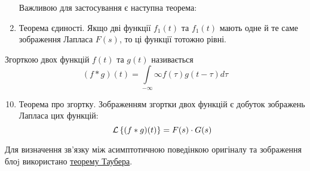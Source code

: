 \begin{enumerate}[label=\arabic*.]
\hspace*{\dimexpr\linewidth-\textwidth\relax} Важливою для застосування є наступна теорема:

		\item Теорема єдиності. Якщо дві функції $f_1(t)$ та $f_1(t)$ мають одне й те саме зображення Лапласа $F(s)$, то ці функції тотожно рівні.
\end{enumerate}
\begin{defin}
Згорткою двох функцій $f(t)$ та $g(t)$ називається
	\begin{equation}
		(f*g)(t) = \int\limits_{-\infty}{\infty} f(\tau) g(t - \tau) d\tau
	\end{equation}
\end{defin}
\begin{enumerate}[label=\arabic*.]
	\setcounter{enumi}{9}
	\item Теорема про згортку. Зображенням згортки двох функцій є добуток зображень Лапласа цих функцій:
		\begin{equation}
			\mathcal{L}\left\{(f*g)(t)\right\} = F(s) \cdot G(s)
		\end{equation}
\end{enumerate}
Для визначення зв’язку між асимптотичною поведінкою оригіналу та зображення блоj використано \hyperref[eq:tauber_thm]{теорему Таубера}.
